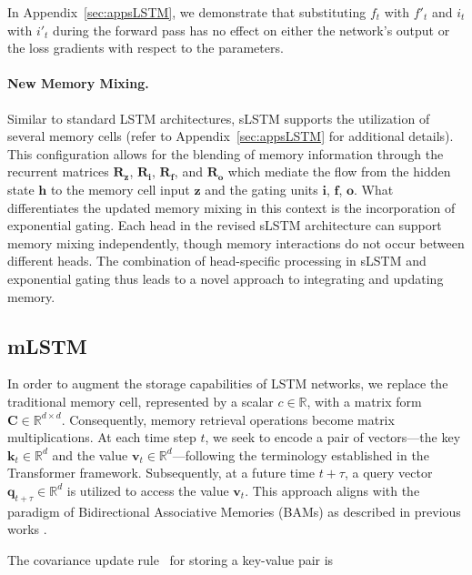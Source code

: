 In Appendix~\ref{sec:appsLSTM}, we demonstrate that substituting $f_t$ with $f'_t$ and $i_t$ with $i'_t$ during the forward pass has no effect on either the network's output or the loss gradients with respect to the parameters.

\paragraph{New Memory Mixing.} Similar to standard LSTM architectures, sLSTM supports the utilization of several memory cells (refer to Appendix~\ref{sec:appsLSTM} for additional details). This configuration allows for the blending of memory information through the recurrent matrices $\mathbf{R}_{\mathbf{z}}$, $\mathbf{R}_{\mathbf{i}}$, $\mathbf{R}_{\mathbf{f}}$, and $\mathbf{R}_{\mathbf{o}}$ which mediate the flow from the hidden state $\mathbf{h}$ to the memory cell input $\mathbf{z}$ and the gating units $\mathbf{i}$, $\mathbf{f}$, $\mathbf{o}$. What differentiates the updated memory mixing in this context is the incorporation of exponential gating. Each head in the revised sLSTM architecture can support memory mixing independently, though memory interactions do not occur between different heads. The combination of head-specific processing in sLSTM and exponential gating thus leads to a novel approach to integrating and updating memory.

\subsection{mLSTM}
\label{sec:mLSTM}

In order to augment the storage capabilities of LSTM networks, we replace the traditional memory cell, represented by a scalar $c \in \mathbb{R}$, with a matrix form $\mathbf{C} \in \mathbb{R}^{d \times d}$. Consequently, memory retrieval operations become matrix multiplications. At each time step $t$, we seek to encode a pair of vectors—the key $\mathbf{k}_t \in \mathbb{R}^d$ and the value $\mathbf{v}_t \in \mathbb{R}^d$—following the terminology established in the Transformer framework. Subsequently, at a future time $t + \tau$, a query vector $\mathbf{q}_{t+\tau} \in \mathbb{R}^d$ is utilized to access the value $\mathbf{v}_t$. This approach aligns with the paradigm of Bidirectional Associative Memories (BAMs) as described in previous works \citep{Kohonen:72,Anderson:72,Nakano:72,Anderson:77}.

The covariance update rule~\citep{Sejnowski:77,Dayan:91} for storing a key-value pair is

